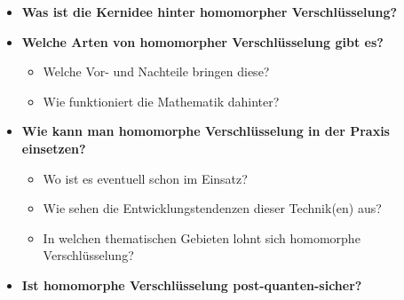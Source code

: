\label{sec:fragen}
\begin{itemize}
    \item \textbf{Was ist die Kernidee hinter homomorpher Verschlüsselung?}
    \item \textbf{Welche Arten von homomorpher Verschlüsselung gibt es?}
    \begin{itemize}
        \item Welche Vor- und Nachteile bringen diese?
        \item Wie funktioniert die Mathematik dahinter?
    \end{itemize}
    \item \textbf{Wie kann man homomorphe Verschlüsselung in der Praxis einsetzen?}
    \begin{itemize}
        \item Wo ist es eventuell schon im Einsatz?
        \item Wie sehen die Entwicklungstendenzen dieser Technik(en) aus?
        \item In welchen thematischen Gebieten lohnt sich homomorphe Verschlüsselung?
    \end{itemize}
    \item \textbf{Ist homomorphe Verschlüsselung post-quanten-sicher?}
\end{itemize}

\vspace{1em}